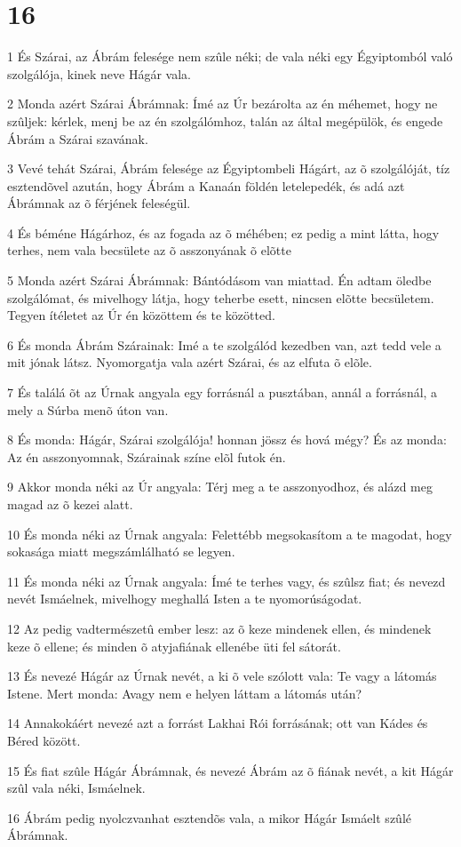 \chapter{16}

\par 1 És Szárai, az Ábrám felesége nem szûle néki; de vala néki egy Égyiptomból való szolgálója, kinek neve Hágár vala.
\par 2 Monda azért Szárai Ábrámnak: Ímé az Úr bezárolta az én méhemet, hogy ne szûljek: kérlek, menj be az én szolgálómhoz, talán az által megépülök, és engede Ábrám a Szárai szavának.
\par 3 Vevé tehát Szárai, Ábrám felesége az Égyiptombeli Hágárt, az õ szolgálóját, tíz esztendõvel azután, hogy Ábrám a Kanaán földén letelepedék, és adá azt Ábrámnak az õ férjének feleségül.
\par 4 És béméne Hágárhoz, és az fogada az õ méhében; ez pedig a mint látta, hogy terhes, nem vala becsülete az õ asszonyának õ elõtte
\par 5 Monda azért Szárai Ábrámnak: Bántódásom van miattad. Én adtam öledbe szolgálómat, és mivelhogy látja, hogy teherbe esett, nincsen elõtte becsületem. Tegyen ítéletet az Úr én közöttem és te közötted.
\par 6 És monda Ábrám Szárainak: Imé a te szolgálód kezedben van, azt tedd vele a mit jónak látsz. Nyomorgatja vala azért Szárai, és az elfuta õ elõle.
\par 7 És találá õt az Úrnak angyala egy forrásnál a pusztában, annál a forrásnál, a mely a Súrba menõ úton van.
\par 8 És monda: Hágár, Szárai szolgálója! honnan jössz és hová mégy? És az monda: Az én asszonyomnak, Szárainak színe elõl futok én.
\par 9 Akkor monda néki az Úr angyala: Térj meg a te asszonyodhoz, és alázd meg magad az õ kezei alatt.
\par 10 És monda néki az Úrnak angyala: Felettébb megsokasítom a te magodat, hogy sokasága miatt megszámlálható se legyen.
\par 11 És monda néki az Úrnak angyala: Ímé te terhes vagy, és szûlsz fiat; és nevezd nevét Ismáelnek, mivelhogy meghallá Isten a te nyomorúságodat.
\par 12 Az pedig vadtermészetû ember lesz: az õ keze mindenek ellen, és mindenek keze õ ellene; és minden õ atyjafiának ellenébe üti fel sátorát.
\par 13 És nevezé Hágár az Úrnak nevét, a ki õ vele szólott vala: Te vagy a látomás Istene. Mert monda: Avagy nem e helyen láttam a látomás után?
\par 14 Annakokáért nevezé azt a forrást Lakhai Rói forrásának; ott van Kádes és Béred között.
\par 15 És fiat szûle Hágár Ábrámnak, és nevezé Ábrám az õ fiának nevét, a kit Hágár szûl vala néki, Ismáelnek.
\par 16 Ábrám pedig nyolczvanhat esztendõs vala, a mikor Hágár Ismáelt szûlé Ábrámnak.

